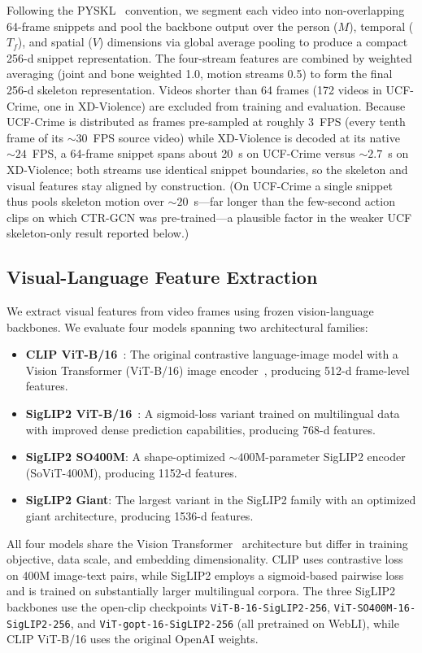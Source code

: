 \documentclass[sigconf]{acmart}
\begin{document}
Following the PYSKL~\cite{yan2022pyskl} convention, we segment each video into non-overlapping 64-frame snippets and pool the backbone output over the person ($M$), temporal ($T_f$), and spatial ($V$) dimensions via global average pooling to produce a compact 256-d snippet representation. The four-stream features are combined by weighted averaging (joint and bone weighted 1.0, motion streams 0.5) to form the final 256-d skeleton representation. Videos shorter than 64 frames (172 videos in UCF-Crime, one in XD-Violence) are excluded from training and evaluation. Because UCF-Crime is distributed as frames pre-sampled at roughly 3~FPS (every tenth frame of its ${\sim}30$~FPS source video) while XD-Violence is decoded at its native ${\sim}24$~FPS, a 64-frame snippet spans about 20~s on UCF-Crime versus ${\sim}2.7$~s on XD-Violence; both streams use identical snippet boundaries, so the skeleton and visual features stay aligned by construction. (On UCF-Crime a single snippet thus pools skeleton motion over ${\sim}20$~s---far longer than the few-second action clips on which CTR-GCN was pre-trained---a plausible factor in the weaker UCF skeleton-only result reported below.)

\subsection{Visual-Language Feature Extraction}

We extract visual features from video frames using frozen vision-language backbones. We evaluate four models spanning two architectural families:
\begin{itemize}
    \item \textbf{CLIP ViT-B/16}~\cite{radford2021clip}: The original contrastive language-image model with a Vision Transformer (ViT-B/16) image encoder~\cite{dosovitskiy2021vit}, producing 512-d frame-level features.
    \item \textbf{SigLIP2 ViT-B/16}~\cite{tschannen2025siglip2}: A sigmoid-loss variant trained on multilingual data with improved dense prediction capabilities, producing 768-d features.
    \item \textbf{SigLIP2 SO400M}: A shape-optimized ${\sim}400$M-parameter SigLIP2 encoder (SoViT-400M), producing 1152-d features.
    \item \textbf{SigLIP2 Giant}: The largest variant in the SigLIP2 family with an optimized giant architecture, producing 1536-d features.
\end{itemize}
All four models share the Vision Transformer~\cite{dosovitskiy2021vit} architecture but differ in training objective, data scale, and embedding dimensionality. CLIP uses contrastive loss on 400M image-text pairs, while SigLIP2 employs a sigmoid-based pairwise loss and is trained on substantially larger multilingual corpora. The three SigLIP2 backbones use the open-clip checkpoints \texttt{ViT-B-16-SigLIP2-256}, \texttt{ViT-SO400M-16-SigLIP2-256}, and \texttt{ViT-gopt-16-SigLIP2-256} (all pretrained on WebLI), while CLIP ViT-B/16 uses the original OpenAI weights.
\end{document}
